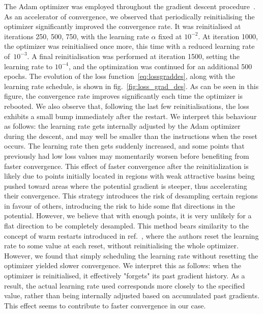 \documentclass[11pt,a4paper]{article}
\begin{document}
	The Adam optimizer was employed throughout the gradient descent procedure~\cite{kingma2017adammethodstochasticoptimization}. As an accelerator of convergence, we observed that periodically reinitialising the optimizer significantly improved the convergence rate. It was reinitialised at iterations {250, 500, 750}, with the learning rate $\alpha$ fixed at $10^{-2}$. At iteration 1000, the optimizer was reinitialised once more, this time with a reduced learning rate of~$10^{-3}$. A final reinitialisation was performed at iteration 1500, setting the learning rate to $10^{-4}$, and the optimization was continued for an additional 500 epochs. The evolution of the loss function~\eqref{eq:lossgraddes}, along with the learning rate schedule, is shown in fig.~\ref{fig:loss_grad_des}. As can be seen in this figure, the convergence rate improves significantly each time the optimizer is rebooted. We also observe that, following the last few reinitialisations, the loss exhibits a small bump immediately after the restart. We interpret this behaviour as follows: the learning rate gets internally adjusted by the Adam optimizer during the descent, and may well be smaller than the instructions when the reset occurs. The learning rate then gets suddenly increased, and some points that previously had low loss values may momentarily worsen before benefiting from faster convergence. This effect of faster convergence after the reinitialization is likely due to points initially located in regions with weak attractive basins being pushed toward areas where the potential gradient is steeper, thus accelerating their convergence. This strategy introduces the risk of desampling certain regions in favour of others, introducing the risk to hide some flat directions in the potential. However, we believe that with enough points, it is very unlikely for a flat direction to be completely desampled. This method bears similarity to the concept of warm restarts introduced in ref.~\cite{loshchilov2017sgdrstochasticgradientdescent}, where the authors reset the learning rate to some value at each reset, without reinitialising the whole optimizer. However, we found that simply scheduling the learning rate without resetting the optimizer yielded slower convergence. We interpret this as follows: when the optimizer is reinitialised, it effectively "forgets" its past gradient history. As a result, the actual learning rate used corresponds more closely to the specified value, rather than being internally adjusted based on accumulated past gradients. This effect seems to contribute to faster convergence in our case.
	
\end{document}
